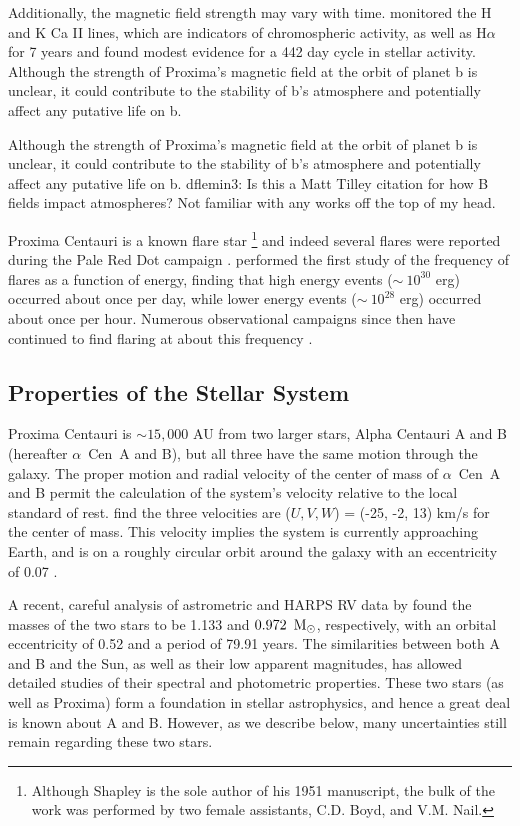 \documentclass[preprint,12pt]{aastex}
\newcommand{\xxx}[1]{{\color{red} #1}} %
\newcommand{\xxx}[1]{{\color{red} #1}} %
\def\msun{{\rm\,M_\odot}}
\def\acen{{$\alpha$~Cen}}
\begin{document}
Additionally, the magnetic field strength may vary with
time. \cite{Cincunegui07} monitored the H and K Ca II lines, which are
indicators of chromospheric activity, as well as H$\alpha$ for 7 years
and found modest evidence for a 442 day cycle in stellar
activity. Although the strength of Proxima's magnetic
field at the orbit of planet b is unclear, it could contribute to the stability
of b's atmosphere and potentially affect any putative life on b.

\xxx{Although the strength of Proxima's magnetic
field at the orbit of planet b is unclear, it could contribute to the stability
of b's atmosphere and potentially affect any putative life on b. dflemin3: Is this a Matt 
Tilley citation for how B fields impact atmospheres? Not familiar with any works off the top of my head.}

Proxima Centauri is a known flare star
\citep{Shapley51}\footnote{Although Shapley is the sole author of his
  1951 manuscript, the bulk of the work was performed by two female
  assistants, C.D. Boyd, and V.M. Nail.}  and indeed several flares
were reported during the Pale Red Dot campaign
\citep{AngladaEscude16}. \cite{Walker81} performed the first study of
the frequency of flares as a function of energy, finding that high
energy events ($\sim~10^{30}$ erg) occurred about once per day, while
lower energy events ($\sim~10^{28}$ erg) occurred about once per
hour. Numerous observational campaigns since then have continued to
find flaring at about this frequency
\citep{Benedict98,AngladaEscude16}.

\subsection{Properties of the Stellar System}
\label{sec:obs:stellarsys}
Proxima Centauri is $\sim 15,000$ AU from two larger stars, Alpha
Centauri A and B (hereafter \acen~A and B), but all three have the
same motion through the galaxy. The proper motion and radial
velocity of the center of mass of \acen~A and B permit the calculation
of the system's velocity relative to the local standard of
rest. \cite{Poveda96} find the three velocities are ($U, V, W$) =
(-25, -2, 13) km/s for the center of mass. This velocity implies the
system is currently approaching Earth, and is on a roughly circular
orbit around the galaxy with an eccentricity of 0.07
\citep{AllenHerrera98}.

A recent, careful analysis of astrometric and HARPS RV data by
\cite{PourbaixBoffin16} found the masses of the two stars to be 1.133
and $0.972~\msun$, respectively, with an orbital eccentricity of 0.52
and a period of 79.91 years. The similarities between both A and B and
the Sun, as well as their low apparent magnitudes, has allowed
detailed studies of their spectral and photometric properties. These
two stars (as well as Proxima) form a foundation in stellar astrophysics,
and hence a great deal is known about A and B. However, as we describe
below, many uncertainties still remain regarding these two stars.
\end{document}
